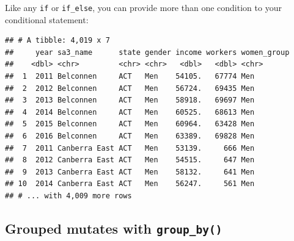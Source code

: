 \documentclass[]{book}
\newenvironment{Shaded}{\begin{snugshade}}{\end{snugshade}}
\newcommand{\DataTypeTok}[1]{\textcolor[rgb]{0.13,0.29,0.53}{#1}}
\newcommand{\DecValTok}[1]{\textcolor[rgb]{0.00,0.00,0.81}{#1}}
\newcommand{\KeywordTok}[1]{\textcolor[rgb]{0.13,0.29,0.53}{\textbf{#1}}}
\newcommand{\NormalTok}[1]{#1}
\newcommand{\OperatorTok}[1]{\textcolor[rgb]{0.81,0.36,0.00}{\textbf{#1}}}
\newcommand{\OtherTok}[1]{\textcolor[rgb]{0.56,0.35,0.01}{#1}}
\newcommand{\StringTok}[1]{\textcolor[rgb]{0.31,0.60,0.02}{#1}}
\begin{document}
Like any \texttt{if} or \texttt{if\_else}, you can provide more than one condition to your conditional statement:

\begin{Shaded}
\end{Shaded}

\begin{verbatim}
## # A tibble: 4,019 x 7
##     year sa3_name      state gender income workers women_group
##    <dbl> <chr>         <chr> <chr>   <dbl>   <dbl> <chr>      
##  1  2011 Belconnen     ACT   Men    54105.   67774 Men        
##  2  2012 Belconnen     ACT   Men    56724.   69435 Men        
##  3  2013 Belconnen     ACT   Men    58918.   69697 Men        
##  4  2014 Belconnen     ACT   Men    60525.   68613 Men        
##  5  2015 Belconnen     ACT   Men    60964.   63428 Men        
##  6  2016 Belconnen     ACT   Men    63389.   69828 Men        
##  7  2011 Canberra East ACT   Men    53139.     666 Men        
##  8  2012 Canberra East ACT   Men    54515.     647 Men        
##  9  2013 Canberra East ACT   Men    58132.     641 Men        
## 10  2014 Canberra East ACT   Men    56247.     561 Men        
## # ... with 4,009 more rows
\end{verbatim}

\hypertarget{grouped-mutates-with-group_by}{%
\subsection{\texorpdfstring{Grouped mutates with \texttt{group\_by()}}{Grouped mutates with group\_by()}}\label{grouped-mutates-with-group_by}}
\end{document}
